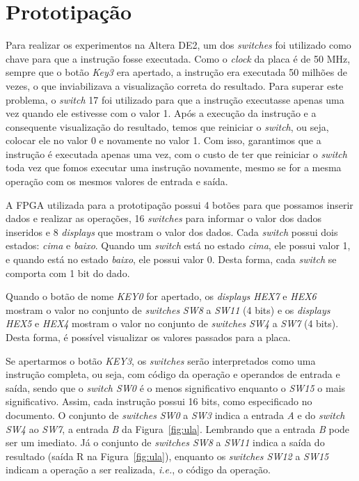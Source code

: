 \documentclass[11pt,a4paper,titlepage]{article}
\begin{document}
\section{Prototipação}

Para realizar os experimentos na Altera DE2, um dos \textit{switches} foi utilizado como chave para que a instrução fosse executada. Como o \textit{clock} da placa é de 50 MHz, sempre que o botão \textit{Key3} era apertado, a instrução era executada 50 milhões de vezes, o que inviabilizava a visualização correta do resultado. Para superar este problema, o \textit{switch} 17 foi utilizado para que a instrução executasse apenas uma vez quando ele estivesse com o valor 1. Após a execução da instrução e a consequente visualização do resultado, temos que reiniciar o \textit{switch}, ou seja, colocar ele no valor 0 e novamente no valor 1. Com isso, garantimos que a instrução é executada apenas uma vez, com o custo de ter que reiniciar o \textit{switch} toda vez que fomos executar uma instrução novamente, mesmo se for a mesma operação com os mesmos valores de entrada e saída.

A FPGA utilizada para a prototipação possui 4 botões para que possamos inserir dados e realizar as operações, 16 \textit{switches} para informar o valor dos dados inseridos e 8 \textit{displays} que mostram o valor dos dados.
Cada \textit{switch} possui dois estados: \textit{cima} e \textit{baixo}.
Quando um \textit{switch} está no estado \textit{cima}, ele possui valor 1, e quando está no estado \textit{baixo}, ele possui valor 0.
Desta forma, cada \textit{switch} se comporta com 1 bit do dado.

Quando o botão de nome \textit{KEY0} for apertado, os \textit{displays HEX7} e \textit{HEX6} mostram o valor no conjunto de \textit{switches} \textit{SW8} a \textit{SW11} (4 bits) e os \textit{displays HEX5} e \textit{HEX4} mostram o valor no conjunto de \textit{switches} \textit{SW4} a \textit{SW7} (4 bits).
Desta forma, é possível visualizar os valores passados para a placa.

Se apertarmos o botão \textit{KEY3}, os \textit{switches} serão interpretados como uma instrução completa, ou seja, com código da operação e operandos de entrada e saída, sendo que o \textit{switch SW0} é o menos significativo enquanto o \textit{SW15} o mais significativo.
Assim, cada instrução possui 16 bits, como especificado no documento.
O conjunto de \textit{switches} \textit{SW0} a \textit{SW3} indica a entrada \textit{A} e do \textit{switch SW4} ao \textit{SW7}, a entrada \textit{B} da Figura~\ref{fig:ula}.
Lembrando que a entrada \textit{B} pode ser um imediato.
Já o conjunto de \textit{switches SW8} a \textit{SW11} indica a saída do resultado (saída R na Figura~\ref{fig:ula}), enquanto os \textit{switches SW12} a \textit{SW15} indicam a operação a ser realizada, \textit{i.e.}, o código da operação.
\end{document}
